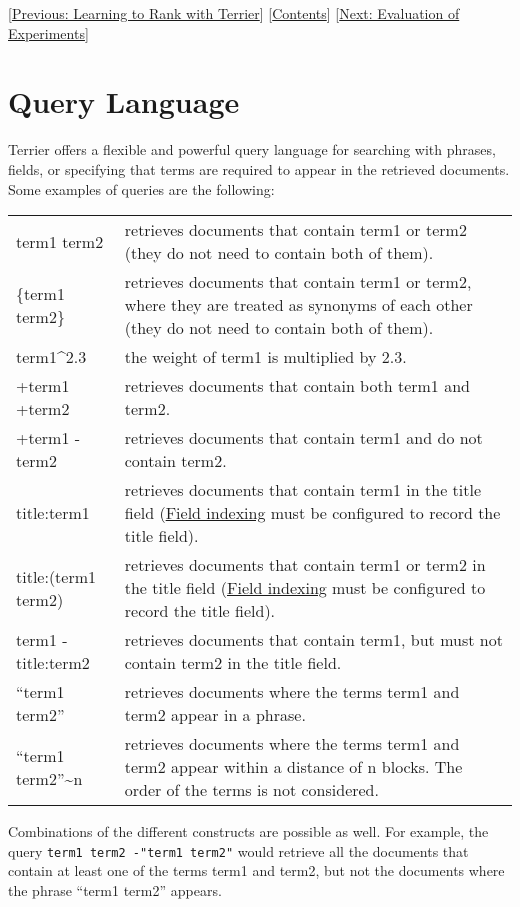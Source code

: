 {[}\href{learning.html}{Previous: Learning to Rank with Terrier}{]}
{[}\href{index.html}{Contents}{]} {[}\href{evaluation.html}{Next:
Evaluation of Experiments}{]}\\

\section{Query Language}\label{query-language}

Terrier offers a flexible and powerful query language for searching with
phrases, fields, or specifying that terms are required to appear in the
retrieved documents. Some examples of queries are the following:

\begin{longtable}[]{@{}ll@{}}
\toprule
term1 term2 & retrieves documents that contain term1 or term2 (they do
not need to contain both of them).\tabularnewline
\{term1 term2\} & retrieves documents that contain term1 or term2, where
they are treated as synonyms of each other (they do not need to contain
both of them).\tabularnewline
term1\^{}2.3 & the weight of term1 is multiplied by 2.3.\tabularnewline
+term1 +term2 & retrieves documents that contain both term1 and
term2.\tabularnewline
+term1 -term2 & retrieves documents that contain term1 and do not
contain term2.\tabularnewline
title:term1 & retrieves documents that contain term1 in the title field
(\href{configure_indexing.html\#fields}{Field indexing} must be
configured to record the title field).\tabularnewline
title:(term1 term2) & retrieves documents that contain term1 or term2 in
the title field (\href{configure_indexing.html\#fields}{Field indexing}
must be configured to record the title field).\tabularnewline
term1 -title:term2 & retrieves documents that contain term1, but must
not contain term2 in the title field.\tabularnewline
``term1 term2'' & retrieves documents where the terms term1 and term2
appear in a phrase.\tabularnewline
``term1 term2''\textasciitilde{}n & retrieves documents where the terms
term1 and term2 appear within a distance of n blocks. The order of the
terms is not considered.\tabularnewline
\bottomrule
\end{longtable}

Combinations of the different constructs are possible as well. For
example, the query \texttt{term1\ term2\ -"term1\ term2"} would retrieve
all the documents that contain at least one of the terms term1 and
term2, but not the documents where the phrase ``term1 term2'' appears.

